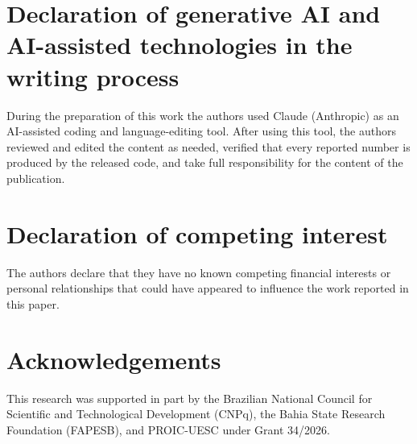 \documentclass[a4paper,fleqn]{cas-dc}
\begin{document}
\section*{Declaration of generative AI and AI-assisted technologies in the writing process}
During the preparation of this work the authors used Claude (Anthropic) as an AI-assisted coding and language-editing tool. After using this tool, the authors reviewed and edited the content as needed, verified that every reported number is produced by the released code, and take full responsibility for the content of the publication.

\section*{Declaration of competing interest}
The authors declare that they have no known competing financial interests or personal relationships that could have appeared to influence the work reported in this paper.

\section*{Acknowledgements}
This research was supported in part by the Brazilian National Council for Scientific and Technological Development (CNPq), the Bahia State Research Foundation (FAPESB), and PROIC-UESC under Grant 34/2026.



\end{document}
